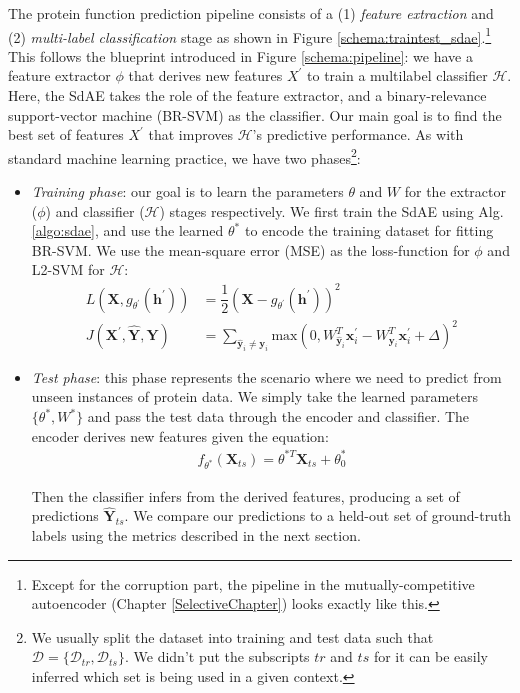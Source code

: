 \par The protein function prediction pipeline consists of a (1) \textit{feature
extraction} and (2) \textit{multi-label classification} stage as shown in
Figure \ref{schema:traintest_sdae}.\footnote{
    Except for the corruption part, the pipeline in the mutually-competitive
    autoencoder (Chapter \ref{SelectiveChapter}) looks exactly like this.
} 
This follows the blueprint introduced in Figure \ref{schema:pipeline}: we have
a feature extractor $\phi$ that derives new features $X^{\prime}$ to train a
multilabel classifier $\mathcal{H}$. Here, the SdAE takes the role of the
feature extractor, and a binary-relevance support-vector machine (BR-SVM) as
the classifier. Our main goal is to find the best set of features $X^{\prime}$
that improves $\mathcal{H}$'s predictive performance. As with standard machine
learning practice, we have two phases\footnote{
  We usually split the dataset into training and test data such that
  $\mathcal{D} = \{\mathcal{D}_{tr}, \mathcal{D}_{ts}\}$. We didn't put the
  subscripts $tr$ and $ts$ for it can be easily inferred which set is being
  used in a given context.
}:

\begin{itemize}
  \item \textit{Training phase}: our goal is to learn the parameters $\theta$
  and $W$ for the extractor ($\phi$) and classifier ($\mathcal{H}$) stages
  respectively. We first train the SdAE using Alg. \ref{algo:sdae}, and use
  the learned $\theta^{\ast}$ to encode the training dataset for fitting
  BR-SVM. We use the mean-square error (MSE) as the loss-function for $\phi$ and
  L2-SVM for $\mathcal{H}$:
  \begin{align}
    \label{eqn:loss_fe_sdae}
    L(\mathbf{X},g_{\theta^{\prime}}(\mathbf{h}^{\prime})) &=
      \dfrac{1}{2}(\mathbf{X} - g_{\theta^{\prime}}(\mathbf{h}^{\prime}))^{2}\\
    \label{eqn:loss_clf_sdae}
    J(\mathbf{X}^{\prime}, \widehat{\mathbf{Y}}, \mathbf{Y}) &= \sum_{\widehat{\mathbf{y}}_i \neq \mathbf{y}_{i}} \text{max}(0, W^{T}_{\widehat{\mathbf{y}}_{i}} \mathbf{x}_{i}^{\prime} - W^{T}_{\mathbf{y}_i}\mathbf{x}^{\prime}_i + \Delta)^2
  \end{align}
  \item \textit{Test phase}: this phase represents the scenario where we need
  to predict from unseen instances of protein data. We simply take the
  learned parameters $\{\theta^{\ast}, W^{\ast}\}$ and pass the test data
  through the encoder and classifier. The encoder derives new features given the
  equation: 
  \begin{align}
    \label{eqn:encoder_mc_sdae}
    f_{\theta^{\ast}}(\mathbf{X}_{ts}) = \theta^{\ast T} \mathbf{X}_{ts} + \theta_{0}^{\ast}
  \end{align}
 
  \noindent Then the classifier infers from the derived features, producing a set of
  predictions $\mathbf{\widehat{Y}}_{ts}$. We compare our predictions to a
  held-out set of ground-truth labels using the metrics described in the next
  section.
\end{itemize}

